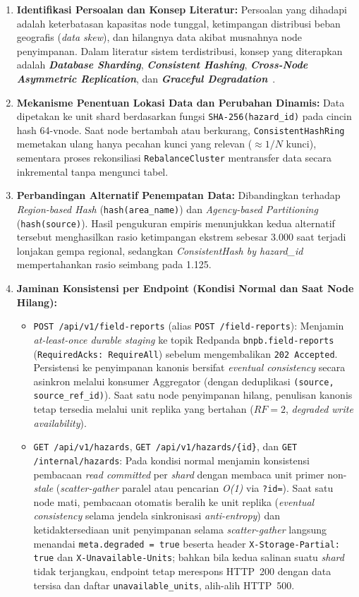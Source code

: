 \begin{enumerate}
    \item \textbf{Identifikasi Persoalan dan Konsep Literatur:} Persoalan yang dihadapi adalah keterbatasan kapasitas node tunggal, ketimpangan distribusi beban geografis (\textit{data skew}), dan hilangnya data akibat musnahnya node penyimpanan. Dalam literatur sistem terdistribusi, konsep yang diterapkan adalah \textbf{\textit{Database Sharding}}, \textbf{\textit{Consistent Hashing}}, \textbf{\textit{Cross-Node Asymmetric Replication}}, dan \textbf{\textit{Graceful Degradation}}~\cite{kleppmann2017designing,karger1997consistent,gilbert2002brewer}.
    \item \textbf{Mekanisme Penentuan Lokasi Data dan Perubahan Dinamis:} Data dipetakan ke unit shard berdasarkan fungsi \texttt{SHA-256(hazard\_id)} pada cincin hash 64-vnode. Saat node bertambah atau berkurang, \texttt{ConsistentHashRing} memetakan ulang hanya pecahan kunci yang relevan ($\approx 1/N$ kunci), sementara proses rekonsiliasi \texttt{RebalanceCluster} mentransfer data secara inkremental tanpa mengunci tabel.
    \item \textbf{Perbandingan Alternatif Penempatan Data:} Dibandingkan terhadap \textit{Region-based Hash} (\texttt{hash(area\_name)}) dan \textit{Agency-based Partitioning} (\texttt{hash(source)}). Hasil pengukuran empiris menunjukkan kedua alternatif tersebut menghasilkan rasio ketimpangan ekstrem sebesar 3.000 saat terjadi lonjakan gempa regional, sedangkan \textit{ConsistentHash by hazard\_id} mempertahankan rasio seimbang pada 1.125.
    \item \textbf{Jaminan Konsistensi per Endpoint (Kondisi Normal dan Saat Node Hilang):}
    \begin{itemize}
        \item \texttt{POST /api/v1/field-reports} (alias \texttt{POST /field-reports}): Menjamin \textit{at-least-once durable staging} ke topik Redpanda \texttt{bnpb.field-reports} (\texttt{RequiredAcks: RequireAll}) sebelum mengembalikan \texttt{202 Accepted}. Persistensi ke penyimpanan kanonis bersifat \textit{eventual consistency} secara asinkron melalui konsumer Aggregator (dengan deduplikasi \texttt{(source, source\_ref\_id)}). Saat satu node penyimpanan hilang, penulisan kanonis tetap tersedia melalui unit replika yang bertahan ($RF=2$, \textit{degraded write availability}).
        \item \texttt{GET /api/v1/hazards}, \texttt{GET /api/v1/hazards/\{id\}}, dan \texttt{GET /internal/hazards}: Pada kondisi normal menjamin konsistensi pembacaan \textit{read committed} per \textit{shard} dengan membaca unit primer non-\textit{stale} (\textit{scatter-gather} paralel atau pencarian \textit{O(1)} via \texttt{?id=}). Saat satu node mati, pembacaan otomatis beralih ke unit replika (\textit{eventual consistency} selama jendela sinkronisasi \textit{anti-entropy}) dan ketidaktersediaan unit penyimpanan selama \textit{scatter-gather} langsung menandai \texttt{meta.degraded = true} beserta header \texttt{X-Storage-Partial: true} dan \texttt{X-Unavailable-Units}; bahkan bila kedua salinan suatu \textit{shard} tidak terjangkau, endpoint tetap merespons HTTP~200 dengan data tersisa dan daftar \texttt{unavailable\_\allowbreak units}, alih-alih HTTP~500.

\end{itemize}
\end{enumerate}
